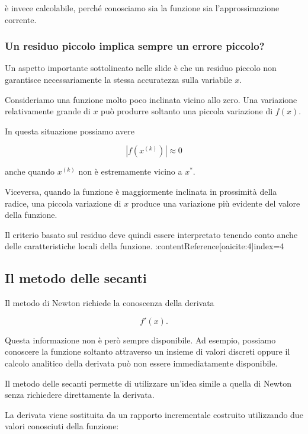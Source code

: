 è invece calcolabile, perché conosciamo sia la funzione sia
l'approssimazione corrente.


\subsubsection{Un residuo piccolo implica sempre un errore piccolo?}

Un aspetto importante sottolineato nelle slide è che un residuo
piccolo non garantisce necessariamente la stessa accuratezza sulla
variabile $x$.

Consideriamo una funzione molto poco inclinata vicino allo zero.
Una variazione relativamente grande di $x$ può produrre soltanto
una piccola variazione di $f(x)$.

In questa situazione possiamo avere

\begin{equation*}
    |f(x^{(k)})|\approx0
\end{equation*}

anche quando $x^{(k)}$ non è estremamente vicino a $x^*$.

Viceversa, quando la funzione è maggiormente inclinata in
prossimità della radice, una piccola variazione di $x$ produce una
variazione più evidente del valore della funzione.

Il criterio basato sul residuo deve quindi essere interpretato
tenendo conto anche delle caratteristiche locali della funzione.
:contentReference[oaicite:4]{index=4}


\subsection{Il metodo delle secanti}

Il metodo di Newton richiede la conoscenza della derivata

\begin{equation*}
    f'(x).
\end{equation*}

Questa informazione non è però sempre disponibile. Ad esempio,
possiamo conoscere la funzione soltanto attraverso un insieme di
valori discreti oppure il calcolo analitico della derivata può non
essere immediatamente disponibile.

Il metodo delle secanti permette di utilizzare un'idea simile a
quella di Newton senza richiedere direttamente la derivata.

La derivata viene sostituita da un rapporto incrementale costruito
utilizzando due valori conosciuti della funzione:

